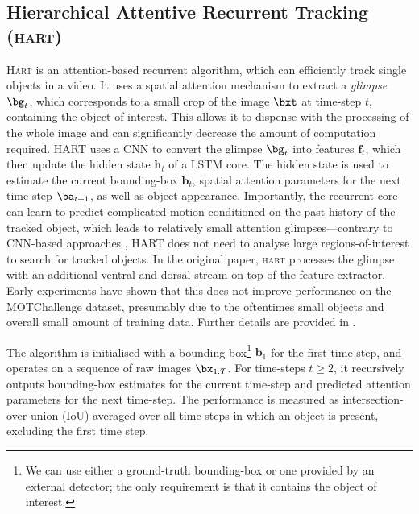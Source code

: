 \subsection{Hierarchical Attentive Recurrent Tracking (\textsc{hart})}
\vspace{-3mm}
\textsc{Hart} is an attention-based recurrent algorithm, which can efficiently track single objects in a video.
It uses a spatial attention mechanism to extract a \textit{glimpse} $\bg_t$, which corresponds to a small crop of the image $\bxt$ at time-step $t$, containing the object of interest.
This allows it to dispense with the processing of the whole image and can significantly decrease the amount of computation required.
\Gls{HART} uses a \gls{CNN} to convert the glimpse $\bg_t$ into features $\mathbf{f}_t$, which then update the hidden state $\mathbf{h}_t$ of a \gls{LSTM} core.
The hidden state is used to estimate the current bounding-box $\mathbf{b}_t$, spatial attention parameters for the next time-step $\ba_{t+1}$, as well as object appearance.
Importantly, the recurrent core can learn to predict complicated motion conditioned on the past history of the tracked object, which leads to relatively small attention glimpses---contrary to \gls{CNN}-based approaches \citep{Held2016goturn,Valmadre2017}, \gls{HART} does not need to analyse large regions-of-interest to search for tracked objects.
In the original paper, \textsc{hart} processes the glimpse with an additional ventral and dorsal stream on top of the feature extractor. Early experiments have shown that this does not improve performance on the MOTChallenge dataset, presumably due to the oftentimes small objects and overall small amount of training data. 
Further details are provided in .

	The algorithm is initialised with a bounding-box\footnote{We can use either a ground-truth bounding-box or one provided by an external detector; the only requirement is that it contains the object of interest.} $\mathbf{b}_1$ for the first time-step, and operates on a sequence of raw images $\bx_{1:T}$.
	For time-steps $t\geq2$, it recursively outputs bounding-box estimates for the current time-step and predicted attention parameters for the next time-step. The performance is measured as intersection-over-union (IoU) averaged over all time steps in which an object is present, excluding the first time step.

